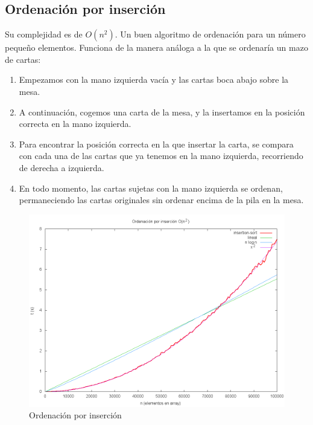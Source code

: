 \subsection{Ordenación por inserción \cite{CORMEN}}
Su complejidad es de $O(n^2)$. Un buen algoritmo de ordenación para un número pequeño elementos. Funciona de la manera análoga a la que se ordenaría un mazo de cartas:
\begin{enumerate}
	\item Empezamos con la mano izquierda vacía y las cartas boca abajo sobre la mesa.
	\item A continuación, cogemos una carta de la mesa, y la insertamos en la posición correcta 			en la mano izquierda.
	\item Para encontrar la posición correcta en la que insertar la carta, se compara con cada 			una de las cartas que ya tenemos en la mano izquierda, recorriendo de derecha a 					izquierda.
\item En todo momento, las cartas sujetas con la mano izquierda se ordenan, permaneciendo las 			cartas originales sin ordenar encima de la pila en la mesa.
\end{enumerate}

	\begin{figure}[H]
  		\centering
   		 \includegraphics[width=1.0\textwidth]{insertion-sort.png}
  		\caption{Ordenación por inserción}
 			 \label{fig:insertion}
		\end{figure}

\newpage
